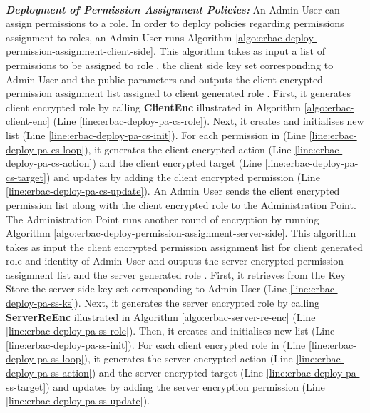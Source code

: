 \documentclass[epsfig,a4paper,11pt,titlepage]{book}
\numberwithin{algorithm}{chapter}
\begin{document}
\noindent \\
\noindent \emph{\textbf{Deployment of Permission Assignment Policies:}} 
An Admin User can assign permissions to a role. In order to deploy policies regarding permissions assignment to roles, an Admin User runs Algorithm \ref{algo:erbac-deploy-permission-assignment-client-side}. This algorithm takes as input a list of permissions  to be assigned to role , the client side key set  corresponding to Admin User  and the public parameters  and outputs the client encrypted permission assignment list  assigned to client generated role . First, it generates client encrypted role  by calling \textbf{ClientEnc} illustrated in Algorithm \ref{algo:erbac-client-enc} (Line \ref{line:erbac-deploy-pa-cs-role}). Next, it creates and initialises new list  (Line \ref{line:erbac-deploy-pa-cs-init}). For each permission in  (Line \ref{line:erbac-deploy-pa-cs-loop}), it generates the client encrypted action  (Line \ref{line:erbac-deploy-pa-cs-action}) and the client encrypted target  (Line \ref{line:erbac-deploy-pa-cs-target}) and updates  by adding the client encrypted permission (Line \ref{line:erbac-deploy-pa-cs-update}). An Admin User sends the client encrypted permission list along with the client encrypted role to the Administration Point. 
The Administration Point runs another round of encryption by running Algorithm \ref{algo:erbac-deploy-permission-assignment-server-side}. This algorithm takes as input the client encrypted permission assignment list  for client generated role  and identity  of Admin User and outputs the server encrypted permission assignment list  and the server generated role . First, it retrieves from the Key Store the server side key set  corresponding to Admin User  (Line \ref{line:erbac-deploy-pa-ss-ks}). Next, it generates the server encrypted role by calling \textbf{ServerReEnc} illustrated in Algorithm \ref{algo:erbac-server-re-enc} (Line \ref{line:erbac-deploy-pa-ss-role}). Then, it creates and initialises new list  (Line \ref{line:erbac-deploy-pa-ss-init}). For each client encrypted role in  (Line \ref{line:erbac-deploy-pa-ss-loop}), it generates the server encrypted action (Line \ref{line:erbac-deploy-pa-ss-action}) and the server encrypted target (Line \ref{line:erbac-deploy-pa-ss-target}) and updates  by adding the server encryption permission (Line \ref{line:erbac-deploy-pa-ss-update}).
\end{document}
